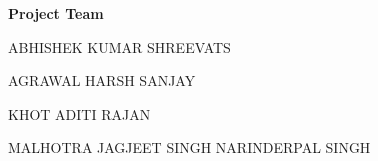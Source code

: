 \documentclass[12pt]{article}
\begin{document}
\vspace{\baselineskip}

\vspace{\baselineskip}

\vspace{\baselineskip}

\vspace{\baselineskip}

\vspace{\baselineskip}
\begin{FlushRight}
\textbf{Project Team}
\end{FlushRight}
\begin{FlushRight}
ABHISHEK KUMAR SHREEVATS\ \ \ \  
\end{FlushRight}
\begin{FlushRight}
AGRAWAL HARSH SANJAY\ \ \  
\end{FlushRight}
\begin{FlushRight}
KHOT ADITI RAJAN\ \ \ \ \  
\end{FlushRight}
\begin{FlushRight}
MALHOTRA JAGJEET SINGH NARINDERPAL SINGH\ \ \  
\end{FlushRight}

\vspace{\baselineskip}
\vspace{\baselineskip}
\vspace{\baselineskip}
\vspace{\baselineskip}
\vspace{\baselineskip}
\vspace{\baselineskip}
\vspace{\baselineskip}
\vspace{\baselineskip}
\vspace{\baselineskip}
\vspace{\baselineskip}
\vspace{\baselineskip}
\vspace{\baselineskip}
\vspace{\baselineskip}
\vspace{\baselineskip}
\vspace{\baselineskip}
\vspace{\baselineskip}
\end{document}
